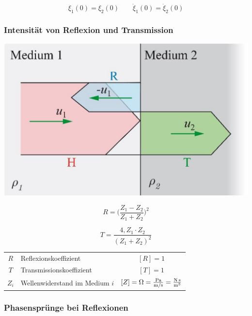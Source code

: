 $$ \xi_1(0) = \xi_2(0) \qquad \dot{\xi}_1(0) = \dot{\xi}_2(0) $$




\subsubsection{Intensität von Reflexion und Transmission}

\begin{minipage}{0.48\linewidth}
\includegraphics[width=0.9\linewidth]{Bilder/Wellen-Optik/reflexionskoeffizient_transmissionskoeffizient} \\
\end{minipage}
\hfill
\begin{minipage}{0.48\linewidth}
$$ \boxed{ R = \Big(  \frac{Z_1 - Z_2}{Z_1 + Z_2}  \Big)^2  } $$

$$ \boxed{ T = \frac{ 4 , Z_1 \cdot
 Z_2}{(Z_1 + Z_2)^2}   } $$
\end{minipage}

\vspace{0.2cm}


\renewcommand{\arraystretch}{1.1}
\begin{tabular}{clc}
$R$ & Reflexionskoeffizient  & $[R] = 1$ \\
$T$ & Transmissionskoeffizient & $[T] = 1 $ \\
$Z_i$ & Wellenwiderstand im Medium $i$ & $[Z] = \mathrm{\Omega} = \frac{\mathrm{Pa}}{\mathrm{m} / \mathrm{s}} = \frac{\mathrm{N} \, \mathrm{s}}{\mathrm{m}^3}$ \\
\end{tabular}
\renewcommand{\arraystretch}{1}



\subsubsection{Phasensprünge bei Reflexionen}

